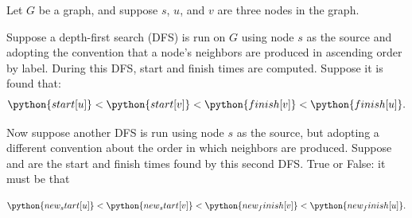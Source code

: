 \begin{prob}
    Let $G$ be a graph, and suppose $s$, $u$, and $v$ are three nodes in the graph.

    Suppose a depth-first search (DFS) is run on $G$ using node $s$ as the
    source and adopting the convention that a node's neighbors are produced in
    ascending order by label. During this DFS, start and finish times are
    computed. Suppose it is found that:
    \[
        \python{start[u]}
        <
        \python{start[v]}
        <
        \python{finish[v]}
        <
        \python{finish[u]}.
    \]

    Now suppose another DFS is run using node $s$ as the source, but adopting a different
    convention about the order in which neighbors are produced. Suppose 
    and  are the start and finish times found by this second DFS. True
    or False: it must be that

    \[
        \python{new_start[u]}
        <
        \python{new_start[v]}
        <
        \python{new_finish[v]}
        <
        \python{new_finish[u]}.
    \]

    \tF

\end{prob}
